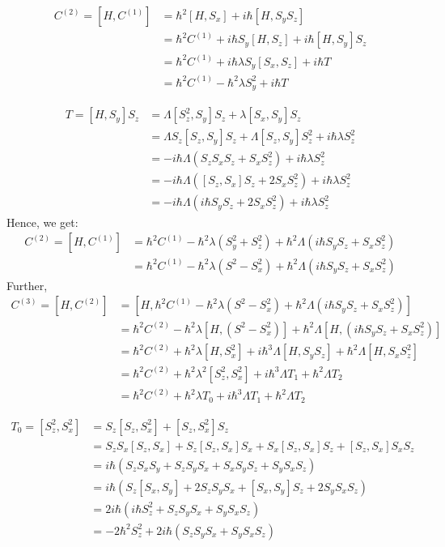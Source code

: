 \documentclass[11pt,a4paper]{article}
\begin{document}
\begin{align*}
C^{(2)}=[H,C^{(1)}] &=     \hbar^2 [H,  S_x]  +  i \hbar[ H,   S_y S_z] \\
&= \hbar^2 C^{(1)}  +  i \hbar S_y[ H,    S_z] +  i \hbar[ H,   S_y ]S_z\\
&= \hbar^2 C^{(1)}  +  i \hbar \lambda S_y [ S_x,    S_z] + i \hbar T\\
&= \hbar^2 C^{(1)} - \hbar^2 \lambda S_y^2  + i \hbar T
\end{align*}

\begin{align*}
T=[ H,   S_y ]S_z &= \Lambda [S_z^2, S_y]S_z + \lambda   [S_x, S_y]S_z   \\
 &=   \Lambda S_z[S_z, S_y]S_z+\Lambda [S_z, S_y]S_z^2 + i \hbar \lambda   S_z^2   \\
  &=  -i \hbar \Lambda  ( S_z S_x S_z+ S_x S_z^2) +  i \hbar \lambda   S_z^2   \\
    &=  -i \hbar \Lambda  ( [S_z, S_x] S_z+ 2 S_x S_z^2) +  i \hbar \lambda   S_z^2   \\
        &=  -i  \hbar \Lambda  ( i \hbar S_y S_z+ 2 S_x S_z^2) +  i \hbar \lambda   S_z^2   
\end{align*}
Hence, we get:
\begin{align*}
C^{(2)}=[H,C^{(1)}]  &= \hbar^2 C^{(1)}  -  \hbar^2 \lambda (S_y^2 +S_z^2)  + \hbar^2 \Lambda  ( i \hbar S_y S_z+  S_x S_z^2) \\
&= \hbar^2 C^{(1)}  -  \hbar^2 \lambda (S^2 - S_x^2)  + \hbar^2 \Lambda  ( i \hbar S_y S_z+  S_x S_z^2)
\end{align*}
Further, 
\begin{align*}
C^{(3)}=[H,C^{(2)}] &= [H,\hbar^2 C^{(1)}  -  \hbar^2 \lambda (S^2 - S_x^2)  + \hbar^2 \Lambda  ( i \hbar S_y S_z+  S_x S_z^2)] \\
&= \hbar^2  C^{(2)}  -  \hbar^2 \lambda [H,(S^2 - S_x^2)]   + \hbar^2 \Lambda  [H,( i \hbar S_y S_z+  S_x S_z^2)] \\
&= \hbar^2  C^{(2)} +  \hbar^2 \lambda [H, S_x^2]   +  i  \hbar^3 \Lambda  [H, S_y S_z] + \hbar^2 \Lambda  [H, S_x S_z^2] \\
&= \hbar^2  C^{(2)} +  \hbar^2 \lambda^2 [S_z^2, S_x^2]   +  i  \hbar^3 \Lambda T_1 + \hbar^2 \Lambda T_2 \\
&= \hbar^2  C^{(2)} +  \hbar^2 \lambda  T_0   +  i  \hbar^3 \Lambda T_1 + \hbar^2 \Lambda T_2 
\end{align*}

\begin{align*}
T_0 =[S_z^2, S_x^2]  &=S_z[S_z, S_x^2] + [S_z, S_x^2]S_z \\
					&=S_z S_x[S_z, S_x] + S_z [S_z, S_x]S_x + S_x[S_z, S_x]S_z + [S_z, S_x]S_xS_z \\
					&=i \hbar(S_z S_xS_y + S_z S_yS_x + S_xS_yS_z + S_y S_xS_z ) \\
					&=i \hbar(S_z [ S_x, S_y] + 2 S_z S_yS_x + [S_x, S_y] S_z + 2S_y S_xS_z ) \\
					&=2i \hbar (i \hbar S_z^2  + S_z S_y S_x   + S_y S_xS_z ) \\
					&=-2 \hbar^2 S_z^2  + 2i \hbar ( S_z S_y S_x   + S_y S_xS_z ) 
\end{align*}
\end{document}

